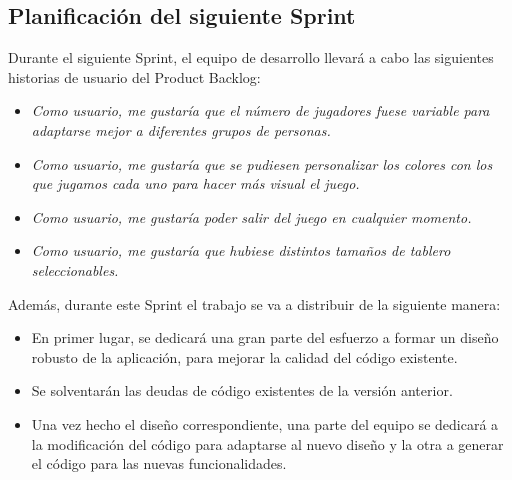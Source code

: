 \documentclass[../../FINAL/Scrum/SCRUM.tex]{subfiles}
\begin{document}
\subsection{Planificación del siguiente Sprint}
Durante el siguiente Sprint, el equipo de desarrollo llevará a cabo las siguientes historias de usuario del Product Backlog:
\begin{itemize}
\item \textit{Como usuario, me gustaría que el número de jugadores fuese variable para adaptarse mejor a diferentes grupos de personas.}
\item \textit{Como usuario, me gustaría que se pudiesen personalizar los colores con los que jugamos cada uno para hacer más visual el juego.}
\item \textit{Como usuario, me gustaría poder salir del juego en cualquier momento.}
\item \textit{Como usuario, me gustaría que hubiese distintos tamaños de tablero seleccionables.}
\end{itemize}
Además, durante este Sprint el trabajo se va a distribuir de la siguiente manera:
\begin{itemize}
\item En primer lugar, se dedicará una gran parte del esfuerzo a formar un diseño robusto de la aplicación, para mejorar la calidad del código existente.
\item Se solventarán las deudas de código existentes de la versión anterior.
\item Una vez hecho el diseño correspondiente, una parte del equipo se dedicará a la modificación del código para adaptarse al nuevo diseño y la otra a generar el código para las nuevas funcionalidades.
\end{itemize}

\end{document}
